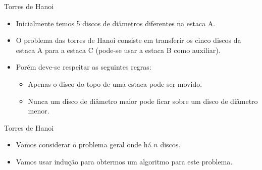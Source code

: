 \documentclass[handout]{beamer}
\begin{document}
\begin{frame}[fragile]{Torres de Hanoi}

    \begin{itemize}[<+->]
        \item Inicialmente temos 5 discos de diâmetros diferentes na estaca A.
        \item O problema das torres de Hanoi consiste em transferir os cinco discos da estaca A para a estaca C (pode-se usar a estaca B como auxiliar).
        \item Porém deve-se respeitar as seguintes regras:
        \begin{itemize}
            \item Apenas o disco do topo de uma estaca pode ser movido.
            \item Nunca um disco de diâmetro maior pode ficar sobre um disco de diâmetro menor.
        \end{itemize}
    \end{itemize}
\end{frame}

\begin{frame}[fragile]{Torres de Hanoi}

    \begin{itemize}
        \item Vamos considerar o problema geral onde há $n$ discos.
        \item Vamos usar indução para obtermos um algoritmo para este problema.
    \end{itemize}
\end{frame}
\end{document}
